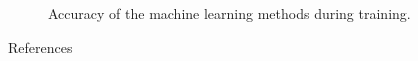 \documentclass{beamer}
\newlength{\colwidthB}
\begin{document}
\begin{frame}{}
\begin{columns}
\begin{column}[T]{\colwidthB}
        \begin{figure}[htb]
          \centering


          \caption{Accuracy of the machine learning methods during training.}\label{fig:cropped-geometry-g}

        \end{figure}

        \begin{block}{References}

          \nocite{*}
          \printbibliography
        \end{block}

      \end{column}

    \end{columns}


\end{frame}
\end{document}
